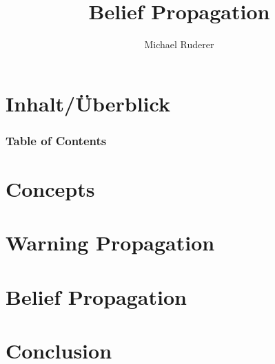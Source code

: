 \documentclass{beamer}
\title{Belief Propagation}
\author{Michael Ruderer}
\institute{Uni Ulm\\}
\begin{document}
\hspace*{-1.49cm}
\frame[plain]{\titlepage}

\hspace*{-0.7cm}
\section*{Inhalt/Überblick} %
\begin{frame}
  \frametitle{Table of Contents}
  \tableofcontents
\end{frame}


\section{Concepts}



\section{Warning Propagation}


\section{Belief Propagation}

\section{Conclusion}
\end{document}
